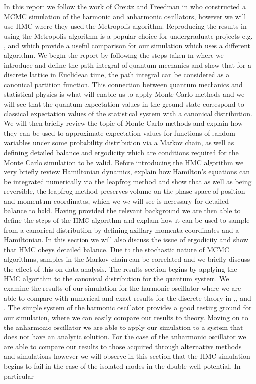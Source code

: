 \documentclass[12pt]{article}
\begin{document}
 In this report we follow the work of Creutz and Freedman in \cite{creutz_freedman_1981} who constructed a MCMC simulation of the harmonic and anharmonic oscillators, however we will use HMC where they used the Metropolis algorithm. Reproducing the results in \cite{creutz_freedman_1981} using the Metropolis algorithm is a popular choice for undergraduate projects e.g. \cite{westbroek_king_vvedensky_durr_2017}, \cite{rodgers_raes} and \cite{slapik_serenone} which provide a useful comparison for our simulation which uses a different algorithm. We begin the report by following the steps taken in \cite{creutz_freedman_1981} where we introduce and define the path integral of quantum mechanics and show that for a discrete lattice in Euclidean time, the path integral can be considered as a canonical partition function. This connection between quantum mechanics and statistical physics is what will enable us to apply Monte Carlo methods and we will see that the quantum expectation values in the ground state correspond to classical expectation values of the statistical system with a canonical distribution. We will then briefly review the topic of Monte Carlo methods and explain how they can be used to approximate expectation values for functions of random variables under some probability distribution via a Markov chain, as well as defining detailed balance and ergodicity which are conditions required for the Monte Carlo simulation to be valid. Before introducing the HMC algorithm we very briefly review Hamiltonian dynamics, explain how Hamilton's equations can be integrated numerically via the leapfrog method and show that as well as being reversible, the leapfrog method preserves volume on the phase space of position and momentum coordinates, which we we will see is necessary for detailed balance to hold. Having provided the relevant background we are then able to define the steps of the HMC algorithm and explain how it can be used to sample from a canonical distribution by defining axillary momenta coordinates and a Hamiltonian. In this section we will also discuss the issue of ergodicity and show that HMC obeys detailed balance. Due to the stochastic nature of MCMC algorithms, samples in the Markov chain can be correlated and we briefly discuss the effect of this on data analysis. The results section begins by applying the HMC algorithm to the canonical distribution for the quantum system. We examine the results of our simulation for the harmonic oscillator where we are able to compare with numerical and exact results for the discrete theory in \cite{creutz_freedman_1981},\cite{westbroek_king_vvedensky_durr_2017}, \cite{rodgers_raes} and \cite{slapik_serenone}. The simple system of the harmonic oscillator provides a good testing ground for our simulation, where we can easily compare our results to theory. Moving on to the anharmonic oscillator we are able to apply our simulation to a system that does not have an analytic solution. For the case of the anharmonic oscillator we are able to compare our results to those acquired through alternative methods \cite{blankenbecler_degrand_sugar_1980} and simulations \cite{rodgers_raes} however we will observe in this section that the HMC simulation begins to fail in the case of the isolated modes in the double well potential. In particular 
\end{document}
